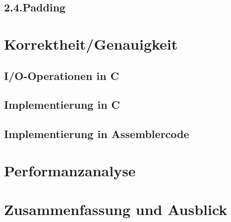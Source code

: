 \documentclass[course=asp]{aspdoc}
\begin{document}
\subsection*{2.4.Padding}


\newpage
\section{Korrektheit/Genauigkeit}
\subsection*{I/O-Operationen in C}
\subsection*{Implementierung in C}
\subsection*{Implementierung in Assemblercode}
\newpage

\section{Performanzanalyse}
\newpage

\section{Zusammenfassung und Ausblick}

\newpage


{}
\end{document}
